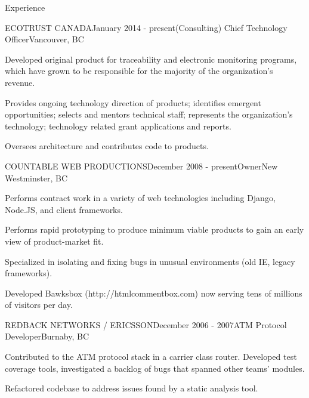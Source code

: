 \documentclass{resume} %
\begin{document}

\begin{rSection}{Experience}


\begin{rSubsection}{ECOTRUST CANADA}{January 2014 - present}{(Consulting) Chief Technology Officer}{Vancouver, BC}
\item Developed original product for traceability and electronic monitoring programs, which have grown to be responsible for the majority of the organization's revenue.
\item Provides ongoing technology direction of products; identifies emergent opportunities; selects and mentors technical staff; represents the organization's technology; technology related grant applications and reports.
\item Oversees architecture and contributes code to products.
\end{rSubsection}


\begin{rSubsection}{COUNTABLE WEB PRODUCTIONS}{December 2008 - present}{Owner}{New Westminster, BC}
\item Performs contract work in a variety of web technologies including Django, Node.JS, and client frameworks.
\item Performs rapid prototyping to produce minimum viable products to gain an early view of product-market fit.
\item Specialized in isolating and fixing bugs in unusual environments (old IE, legacy frameworks).
\item Developed Bawksbox (http://htmlcommentbox.com) now serving tens of millions of visitors per day.
\end{rSubsection}

\begin{rSubsection}{REDBACK NETWORKS / ERICSSON}{December 2006 - 2007}{ATM Protocol Developer}{Burnaby, BC}
\item Contributed to the ATM protocol stack in a carrier class router. Developed test coverage tools, investigated a backlog of bugs that spanned other teams’ modules.
\item Refactored codebase to address issues found by a static analysis tool.


\end{rSubsection}
\end{rSection}
\end{document}
